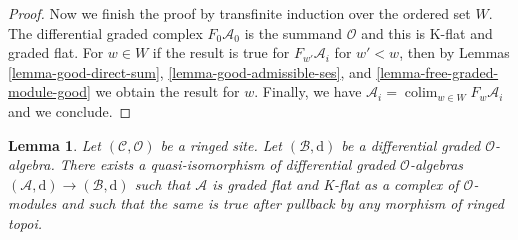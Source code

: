 \documentclass{stacks-project}
\theoremstyle{plain}
\newtheorem{lemma}[subsection]{Lemma}
\theoremstyle{definition}
\theoremstyle{remark}
\numberwithin{equation}{subsection}
\def\colim{\mathop{\mathrm{colim}}\nolimits}
\begin{document}
\begin{proof}
\medskip\noindent
Now we finish the proof by transfinite induction over the ordered
set $W$. The differential graded complex $F_0\mathcal{A}_0$ is
the summand $\mathcal{O}$ and this is K-flat and graded flat.
For $w \in W$ if the result is true for $F_{w'}\mathcal{A}_i$
for $w' < w$, then by Lemmas \ref{lemma-good-direct-sum},
\ref{lemma-good-admissible-ses}, and \ref{lemma-free-graded-module-good}
we obtain the result for $w$. Finally, we have
$\mathcal{A}_i = \colim_{w \in W} F_w\mathcal{A}_i$ and
we conclude.
\end{proof}

\begin{lemma}
\label{lemma-good-dga}
Let $(\mathcal{C}, \mathcal{O})$ be a ringed site.
Let $(\mathcal{B}, \text{d})$ be a differential graded $\mathcal{O}$-algebra.
There exists a quasi-isomorphism of differential graded $\mathcal{O}$-algebras
$(\mathcal{A}, \text{d}) \to (\mathcal{B}, \text{d})$ such that
$\mathcal{A}$ is graded flat and K-flat as a complex of $\mathcal{O}$-modules
and such that the same is true after pullback by any morphism of
ringed topoi.
\end{lemma}
\end{document}
